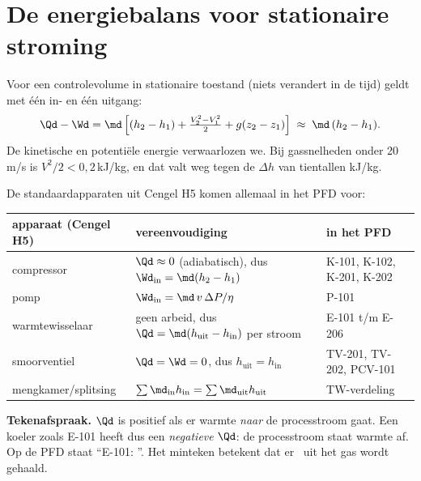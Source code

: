 \section{De energiebalans voor stationaire stroming}
\begin{methode}
Voor een controlevolume in stationaire toestand (niets verandert in de tijd) geldt met één in- en één uitgang:
\[
\Qd - \Wd = \md\left[(h_2-h_1) + \tfrac{V_2^2-V_1^2}{2} + g(z_2-z_1)\right] \;\approx\; \md\,(h_2-h_1).
\]
De kinetische en potentiële energie verwaarlozen we. Bij gassnelheden onder 20\,m/s is
$V^2/2 < 0{,}2$\,kJ/kg, en dat valt weg tegen de $\Delta h$ van tientallen kJ/kg.
\end{methode}
De standaardapparaten uit Cengel H5 komen allemaal in het PFD voor:
\begin{center}
\begin{tabularx}{\textwidth}{lXl}
\toprule
apparaat (Cengel H5) & vereenvoudiging & in het PFD\\
\midrule
compressor & $\Qd\approx 0$ (adiabatisch), dus $\Wd_\mathrm{in} = \md(h_2-h_1)$ & K-101, K-102, K-201, K-202\\
pomp & $\Wd_\mathrm{in} = \md\,v\,\Delta P/\eta$ & P-101\\
warmtewisselaar & geen arbeid, dus $\Qd = \md(h_\mathrm{uit}-h_\mathrm{in})$ per stroom & E-101 t/m E-206\\
smoorventiel & $\Qd=\Wd=0$, dus $h_\mathrm{uit} = h_\mathrm{in}$ & TV-201, TV-202, PCV-101\\
mengkamer/splitsing & $\sum \md_\mathrm{in} h_\mathrm{in} = \sum \md_\mathrm{uit} h_\mathrm{uit}$ & TW-verdeling\\
\bottomrule
\end{tabularx}
\end{center}
\textbf{Tekenafspraak.} $\Qd$ is positief als er warmte \emph{naar} de processtroom gaat. Een koeler zoals E-101
heeft dus een \emph{negatieve} $\Qd$: de processtroom staat warmte af. Op de PFD staat ``E-101: \kW''.
Het minteken betekent dat er \kW\ uit het gas wordt gehaald.

